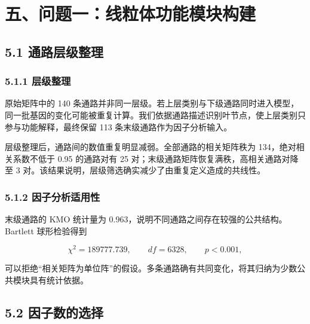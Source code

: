 \hypertarget{ux4e94ux95eeux9898ux4e00ux7ebfux7c92ux4f53ux529fux80fdux6a21ux5757ux6784ux5efa}{%
\section{五、问题一：线粒体功能模块构建}\label{ux4e94ux95eeux9898ux4e00ux7ebfux7c92ux4f53ux529fux80fdux6a21ux5757ux6784ux5efa}}

\hypertarget{51-ux901aux8defux5c42ux7ea7ux6574ux7406}{%
\subsection{5.1 通路层级整理}\label{51-ux901aux8defux5c42ux7ea7ux6574ux7406}}

\hypertarget{511-ux5c42ux7ea7ux6574ux7406}{%
\subsubsection{5.1.1 层级整理}\label{511-ux5c42ux7ea7ux6574ux7406}}

原始矩阵中的 140 条通路并非同一层级。若上层类别与下级通路同时进入模型，同一批基因的变化可能被重复计算。我们依据通路描述识别叶节点，使上层类别只参与功能解释，最终保留 113 条末级通路作为因子分析输入。

层级整理后，通路间的数值重复明显减弱。全部通路的相关矩阵秩为 134，绝对相关系数不低于 0.95 的通路对有 25 对；末级通路矩阵恢复满秩，高相关通路对降至 3 对。该结果说明，层级筛选确实减少了由重复定义造成的共线性。

\hypertarget{512-ux56e0ux5b50ux5206ux6790ux9002ux7528ux6027}{%
\subsubsection{5.1.2 因子分析适用性}\label{512-ux56e0ux5b50ux5206ux6790ux9002ux7528ux6027}}

末级通路的 KMO 统计量为 0.963，说明不同通路之间存在较强的公共结构。Bartlett 球形检验得到

\[
\chi^2=189777.739,\qquad df=6328,\qquad p<0.001,
\]

可以拒绝``相关矩阵为单位阵''的假设。多条通路确有共同变化，将其归纳为少数公共模块具有统计依据。

\hypertarget{52-ux56e0ux5b50ux6570ux7684ux9009ux62e9}{%
\subsection{5.2 因子数的选择}\label{52-ux56e0ux5b50ux6570ux7684ux9009ux62e9}}

